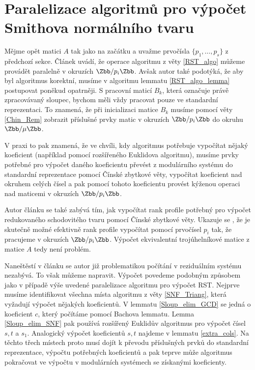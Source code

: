 \section{Paralelizace algoritmů pro výpočet Smithova normálního tvaru}
Mějme opět matici $ A $ tak jako na začátku a uvažme prvočísla
$ \{ p_1, \dots, p_s \} $ z předchozí sekce. Článek \cite[Theorem 16]{triang}
uvádí, že operace algoritmu z věty \ref{RST_algo} můžeme provádět paralelně
v okruzích $ \Zbb / p_i \Zbb $. Avšak autor také podotýká, že aby byl algoritmus
korektní, musíme v algoritmu lemmatu \ref{RST_algo_lemma} postupovat poněkud
opatrněji. S pracovní maticí $ B_k $, která označuje právě zpracovávaný sloupec,
bychom měli vždy pracovat pouze ve standardní reprezentaci. To znamená, že při
inicializaci matice $ B_k $ musíme pomocí věty \ref{Chin_Rem} zobrazit příslušné
prvky matic v okruzích $ \Zbb / p_i \Zbb $ do okruhu $ \Zbb / \mu \Zbb $.

V praxi to pak znamená, že ve chvíli, kdy algoritmus potřebuje vypočítat nějaký
koeficient (například pomocí rozšířeného Euklidova algoritmu), musíme prvky
potřebné pro výpočet daného koeficientu převést z modulárního systému do standardní
reprezentace pomocí Čínské zbytkové věty, vypočítat koeficient nad okruhem celých
čísel a pak pomocí tohoto koeficientu provést kýženou operaci nad maticemi v
okruzích $ \Zbb / p_i \Zbb $.

Autor článku \cite{triang} se
také zabývá tím, jak vypočítat rank profile potřebný pro výpočet redukovaného
schodovitého tvaru pomocí Čínské zbytkové věty. Ukazuje se \cite[Theorem 15]{triang},
že je skutečně možné efektivně rank profile vypočítat pomocí prvočísel $ p_i $
tak, že pracujeme v okruzích $ \Zbb / p_i \Zbb $.
Výpočet ekvivalentní trojúhelníkové matice z matice $ A $ tedy není problém.

Naneštěstí v článku \cite{SNF_Arne} se autor již problematikou počítání v
reziduálním systému nezabývá. To však můžeme napravit. Výpočet povedeme podobným
způsobem jako v případě výše uvedené paralelizace algoritmu pro výpočet RST.
Nejprve musíme identifikovat všechna místa algoritmu z věty \ref{SNF_Triang},
která vyžadují výpočet nějakých koeficientů. V lemmatu \ref{Sloup_elim_GCD}
se jedná o koeficient $ c $, který počítáme pomocí Bachova lemmatu. Lemma
\ref{Sloup_elim_SNF} pak používá rozšířený Euklidův algoritmus pro výpočet čísel
$ s, t $ a $ s_1 $. Analogický výpočet koeficientů $ s, t $ najdeme v lemmatu
\ref{extra_cols}. Na těchto třech místech proto musí dojít k
převodu příslušných prvků do standardní reprezentace, výpočtu potřebných
koeficientů a pak teprve může algoritmus pokračovat ve výpočtu v modulárních
systémech se získanými koeficienty.

